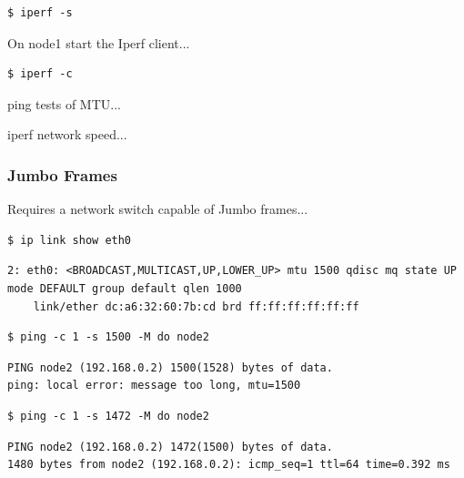 \documentclass{report}
\begin{document}
\lstset{style=type}
\begin{lstlisting}
$ iperf -s
\end{lstlisting}

On node1 start the Iperf client...

\lstset{style=type}
\begin{lstlisting}
$ iperf -c
\end{lstlisting}

ping tests of MTU...




iperf network speed...





\subsubsection{Jumbo Frames}

Requires a network switch capable of Jumbo frames...


\lstset{style=type}
\begin{lstlisting}
$ ip link show eth0
\end{lstlisting}


\lstset{style=type}
\begin{lstlisting}
2: eth0: <BROADCAST,MULTICAST,UP,LOWER_UP> mtu 1500 qdisc mq state UP mode DEFAULT group default qlen 1000
    link/ether dc:a6:32:60:7b:cd brd ff:ff:ff:ff:ff:ff
\end{lstlisting}



\lstset{style=type}
\begin{lstlisting}
$ ping -c 1 -s 1500 -M do node2
\end{lstlisting}

\lstset{style=type}
\begin{lstlisting}
PING node2 (192.168.0.2) 1500(1528) bytes of data.
ping: local error: message too long, mtu=1500
\end{lstlisting}


\lstset{style=type}
\begin{lstlisting}
$ ping -c 1 -s 1472 -M do node2
\end{lstlisting}


\lstset{style=type}
\begin{lstlisting}
PING node2 (192.168.0.2) 1472(1500) bytes of data.
1480 bytes from node2 (192.168.0.2): icmp_seq=1 ttl=64 time=0.392 ms
\end{lstlisting}
\end{document}
